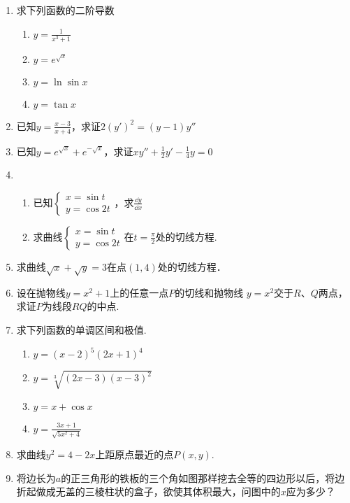 \begin{enumerate}
\item 求下列函数的二阶导数
\begin{multicols}{2}
\begin{enumerate}[(1)]
    \item $y=\frac{1}{x^3+1}$
    \item $y=e^{\sqrt{x}}$
    \item $y=\ln\sin x$
    \item $y=\tan x$
\end{enumerate}
\end{multicols}
\item 已知$y=\frac{x-3}{x+4}$，求证$2(y')^2=(y-1)y''$
\item 已知$y=e^{\sqrt{x}}+e^{-\sqrt{x}}$，求证$xy''+\frac{1}{2}y'-\frac{1}{4}y=0$

\item \begin{enumerate}[(1)]
    \item 已知$\begin{cases}
        x=\sin t\\ y=\cos 2t
    \end{cases}$，求$\frac{\dd y}{\dd x}$
    \item 求曲线$\begin{cases}
        x=\sin t\\y=\cos 2t
    \end{cases}$在$t=\frac{\pi}{2}$处的切线方程.
\end{enumerate}

\item 求曲线$\sqrt{x}+\sqrt{y}=3$在点$(1,4)$处的切线方程．
\item 设在抛物线$y=x^2+1$上的任意一点$P$的切线和抛物线
$y=x^2$交于$R$、$Q$两点，求证$P$为线段$RQ$的中点.
\item 求下列函数的单调区间和极值.
\begin{multicols}{2}
\begin{enumerate}[(1)]
    \item $y=(x-2)^5(2x+1)^4$
    \item $y=\sqrt[3]{(2x-3)(x-3)^2}$
    \item $y=x+\cos x$
    \item $y=\frac{3x+1}{\sqrt{5x^2+4}}$
\end{enumerate}
\end{multicols}

\item 求曲线$y^2=4-2x$上距原点最近的点$P(x,y)$.
\item 将边长为$a$的正三角形的铁板的三个角如图那样挖去全等的四边形以后，将边折起做成无盖的三棱柱状的盒子，欲使其体积最大，问图中的$x$应为多少？


\end{enumerate}
